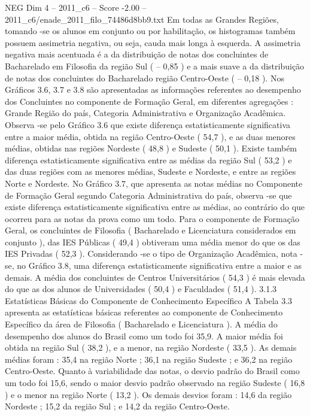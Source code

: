 \begin{textsample}{NEG Dim 4 – 2011\_c6 – Score -2.00 – 2011\_c6/enade\_2011\_filo\_74486d8bb9.txt}
Em todas as Grandes Regiões, tomando -se os alunos em conjunto ou por habilitação, os histogramas também possuem assimetria negativa, ou seja, cauda mais longa à esquerda.
A assimetria negativa mais acentuada é a da distribuição de notas dos concluintes de Bacharelado em Filosofia da região Sul ( – 0,85 ) e a mais suave a da distribuição de notas dos concluintes do Bacharelado região Centro-Oeste ( – 0,18 ).
Nos Gráficos 3.6, 3.7 e 3.8 são apresentadas as informações referentes ao desempenho dos Concluintes no componente de Formação Geral, em diferentes agregações : Grande Região do país, Categoria Administrativa e Organização Acadêmica.
Observa -se pelo Gráfico 3.6 que existe diferença estatisticamente significativa entre a maior média, obtida na região Centro-Oeste ( 54,7 ), e as duas menores médias, obtidas nas regiões Nordeste ( 48,8 ) e Sudeste ( 50,1 ).
Existe também diferença estatisticamente significativa entre as médias da região Sul ( 53,2 ) e das duas regiões com as menores médias, Sudeste e Nordeste, e entre as regiões Norte e Nordeste.
No Gráfico 3.7, que apresenta as notas médias no Componente de Formação Geral segundo Categoria Administrativa do país, observa -se que existe diferença estatisticamente significativa entre as médias, ao contrário do que ocorreu para as notas da prova como um todo.
Para o componente de Formação Geral, os concluintes de Filosofia ( Bacharelado e Licenciatura considerados em conjunto ), das IES Públicas ( 49,4 ) obtiveram uma média menor do que os das IES Privadas ( 52,3 ).
Considerando -se o tipo de Organização Acadêmica, nota -se, no Gráfico 3.8, uma diferença estatisticamente significativa entre a maior e as demais.
A média dos concluintes de Centros Universitários ( 54,3 ) é mais elevada do que as dos alunos de Universidades ( 50,4 ) e Faculdades ( 51,4 ). 3.1.3 Estatísticas Básicas do Componente de Conhecimento Específico A Tabela 3.3 apresenta as estatísticas básicas referentes ao componente de Conhecimento Específico da área de Filosofia ( Bacharelado e Licenciatura ).
A média do desempenho dos alunos do Brasil como um todo foi 35,9.
A maior média foi obtida na região Sul ( 38,2 ), e a menor, na região Nordeste ( 33,5 ).
As demais médias foram : 35,4 na região Norte ; 36,1 na região Sudeste ; e 36,2 na região Centro-Oeste.
Quanto à variabilidade das notas, o desvio padrão do Brasil como um todo foi 15,6, sendo o maior desvio padrão observado na região Sudeste ( 16,8 ) e o menor na região Norte ( 13,2 ).
Os demais desvios foram : 14,6 da região Nordeste ; 15,2 da região Sul ; e 14,2 da região Centro-Oeste.

\end{textsample}
